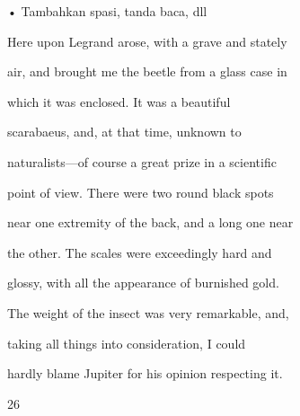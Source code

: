 \documentclass{article}
\begin{document}

• Tambahkan spasi, tanda baca, dll

 Here upon Legrand arose, with a grave and stately 

air, and brought me the beetle from a glass case in 

which it was enclosed. It was a beautiful 

scarabaeus, and, at that time, unknown to 

naturalists—of course a great prize in a scientific 

point of view. There were two round black spots 

near one extremity of the back, and a long one near 

the other. The scales were exceedingly hard and 

glossy, with all the appearance of burnished gold. 

The weight of the insect was very remarkable, and, 

taking all things into consideration, I could 

hardly blame Jupiter for his opinion respecting it.

26
\end{document}
